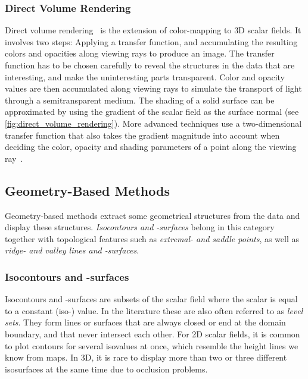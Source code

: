 %
\subsubsection{Direct Volume Rendering}
%
Direct volume rendering~\cite{Levoy1988,Drebin1988} is the extension of
color-mapping to \ac{3D} scalar fields.
%
It involves two steps: Applying a transfer function, and accumulating the
resulting colors and opacities along viewing rays to produce an image.
%
The transfer function has to be chosen carefully to reveal the structures in the
data that are interesting, and make the uninteresting parts transparent.
%
Color and opacity values are then accumulated along viewing rays to simulate the
transport of light through a semitransparent medium.
%
The shading of a solid surface can be approximated by using the gradient of the
scalar field as the surface normal (see \cref{fig:direct_volume_rendering}).
%
More advanced techniques use a two-dimensional transfer function that also takes
the gradient magnitude into account when deciding the color, opacity and
shading parameters of a point along the viewing ray~\cite{Kindlmann1998}.
%

\subsection{Geometry-Based Methods} %
\label{sub:scalar_geometry_based}
%
Geometry-based methods extract some geometrical structures from the data and
display these structures.
%
\emph{Isocontours and -surfaces} belong in this category together with
topological features such as \emph{extremal- and saddle points}, as well as
\emph{ridge- and valley lines and -surfaces}.
%

%
\subsubsection{Isocontours and -surfaces}
%
Isocontours and -surfaces are subsets of the scalar field where the
scalar is equal to a constant (iso-) value.
%
In the literature these are also often referred to as \emph{level sets}.
%
They form lines or surfaces that are always closed or end at the domain
boundary, and that never intersect each other.
%
For \ac{2D} scalar fields, it is common to plot contours for several isovalues
at once, which resemble the height lines we know from maps.
%
In \ac{3D}, it is rare to display more than two or three different isosurfaces
at the same time due to occlusion problems.
%

